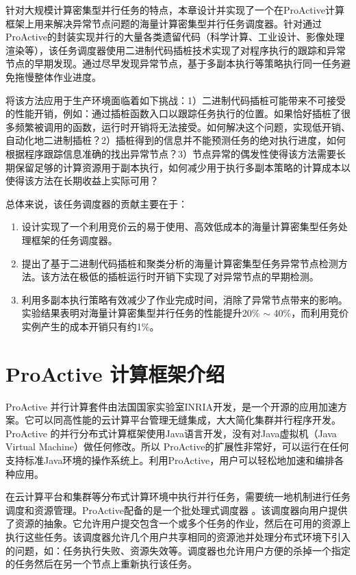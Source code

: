针对大规模计算密集型并行任务的特点，本章设计并实现了一个在ProActive计算框架上用来解决异常节点问题的海量计算密集型并行任务调度器。针对通过ProActive的封装实现并行的大量各类遗留代码（科学计算、工业设计、影像处理渲染等），该任务调度器使用二进制代码插桩技术实现了对程序执行的跟踪和异常节点的早期发现。通过尽早发现异常节点，基于多副本执行等策略执行同一任务避免拖慢整体作业进度。

将该方法应用于生产环境面临着如下挑战：1）二进制代码插桩可能带来不可接受的性能开销，例如：通过插桩函数入口以跟踪任务执行的位置。如果恰好插桩了很多频繁被调用的函数，运行时开销将无法接受。如何解决这个问题，实现低开销、自动化地二进制插桩？2）插桩得到的信息并不能预测任务的绝对执行进度，如何根据程序跟踪信息准确的找出异常节点？3）节点异常的偶发性使得该方法需要长期保留足够的计算资源用于副本执行，如何减少用于执行多副本策略的计算成本以使得该方法在长期收益上实际可用？

总体来说，该任务调度器的贡献主要在于：
\begin{enumerate}
\item 设计实现了一个利用竞价云的易于使用、高效低成本的海量计算密集型任务处理框架的任务调度器。
\item 提出了基于二进制代码插桩和聚类分析的海量计算密集型任务异常节点检测方法。该方法在极低的插桩运行时开销下实现了对异常节点的早期检测。
\item 利用多副本执行策略有效减少了作业完成时间，消除了异常节点带来的影响。实验结果表明对海量计算密集型并行任务的性能提升20\% $\sim$ 40\%，而利用竞价实例产生的成本开销只有约1\%。
\end{enumerate}

\section{ProActive 计算框架介绍}
ProActive \cite{ProActive} 并行计算套件由法国国家实验室INRIA开发，是一个开源的应用加速方案。它可以同高性能的云计算平台管理无缝集成，大大简化集群并行程序开发。ProActive 的并行分布式计算框架使用Java语言开发，没有对Java虚拟机（Java Virtual Machine）做任何修改。所以 ProActive的扩展性非常好，可以运行在任何支持标准Java环境的操作系统上。利用ProActive，用户可以轻松地加速和编排各种应用。

在云计算平台和集群等分布式计算环境中执行并行任务，需要统一地机制进行任务调度和资源管理。ProActive配备的是一个批处理式调度器 \cite{pascheduling}。该调度器向用户提供了资源的抽象。它允许用户提交包含一个或多个任务的作业，然后在可用的资源上执行这些任务。该调度器允许几个用户共享相同的资源池并处理分布式环境下引入的问题，如：任务执行失败、资源失效等。调度器也允许用户方便的杀掉一个指定的任务然后在另一个节点上重新执行该任务。

